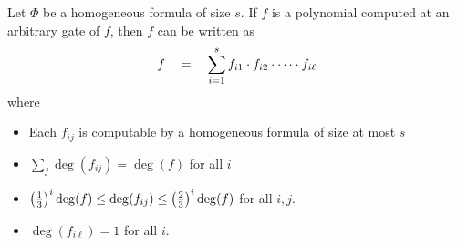 \documentclass[12pt]{report}
\begin{document}
\begin{lemma}[\cite{HY11a}]\label{lem:HY}
Let $\Phi$ be a homogeneous formula of size $s$. If $f$ is a polynomial computed at an arbitrary gate of $f$, then $f$ can be written as
\begin{equation}\label{eqn:vsbr-hom-form}
f \quad = \quad \sum_{i=1}^s f_{i1} \cdot f_{i2} \cdot \dots \cdot  f_{i\ell}
\end{equation}
where 
\begin{itemize}
\item Each $f_{ij}$ is computable by a homogeneous formula of size at most $s$
\item $\sum_j \deg(f_{ij}) = \deg(f)$ for all $i$
\item $\left(\frac{1}{3}\right)^i \deg(f) \leq \deg(f_{ij}) \leq \left(\frac{2}{3}\right)^i \deg(f)$ for all $i,j$. 
\item $\deg(f_{i\ell}) = 1$ for all $i$. 
\end{itemize}
\end{lemma}
\end{document}
